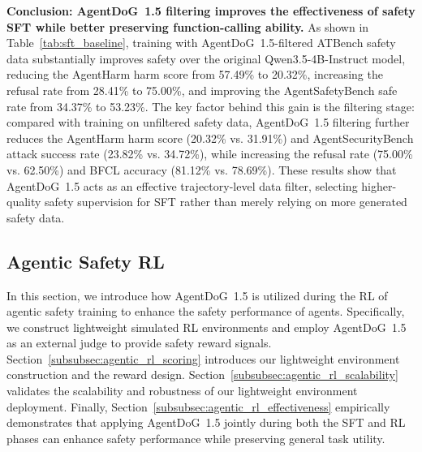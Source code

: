 \documentclass{llmxive}
\providecommand{\toolAG}{{\agentdog{}}\xspace}
\providecommand{\agentdog}{AgentDoG~1.5\xspace}
\begin{document}
\textbf{Conclusion: \toolAG{} filtering improves the effectiveness of safety SFT while better preserving function-calling ability.}
As shown in Table~\ref{tab:sft_baseline}, training with \toolAG{}-filtered ATBench safety data substantially improves safety over the original Qwen3.5-4B-Instruct model, reducing the AgentHarm harm score from 57.49\% to 20.32\%, increasing the refusal rate from 28.41\% to 75.00\%, and improving the AgentSafetyBench safe rate from 34.37\% to 53.23\%. The key factor behind this gain is the filtering stage: compared with training on unfiltered safety data, \toolAG{} filtering further reduces the AgentHarm harm score (20.32\% vs. 31.91\%) and AgentSecurityBench attack success rate (23.82\% vs. 34.72\%), while increasing the refusal rate (75.00\% vs. 62.50\%) and BFCL accuracy (81.12\% vs. 78.69\%). These results show that \toolAG{} acts as an effective trajectory-level data filter, selecting higher-quality safety supervision for SFT rather than merely relying on more generated safety data.


\subsection{Agentic Safety RL}
\label{subsec:agentic_rl}
In this section, we introduce how \toolAG{} is utilized during the RL of agentic safety training to enhance the safety performance of agents. Specifically, we construct lightweight simulated RL environments and employ \toolAG{} as an external judge to provide safety reward signals. Section~\ref{subsubsec:agentic_rl_scoring} introduces our lightweight environment construction and the reward design. Section~\ref{subsubsec:agentic_rl_scalability} validates the scalability and robustness of our lightweight environment deployment. Finally, Section~\ref{subsubsec:agentic_rl_effectiveness} empirically demonstrates that applying \toolAG{} jointly during both the SFT and RL phases can enhance safety performance while preserving general task utility.
\end{document}
